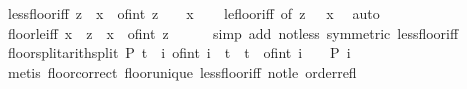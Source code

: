 \begin{isabellebody}
\endisatagproof
{\isafoldproof}%
%
\isadelimproof
\isanewline
%
\endisadelimproof
\isanewline
{}\isamarkupfalse%
\ less{\isacharunderscore}{\kern0pt}floor{\isacharunderscore}{\kern0pt}iff{\isacharcolon}{\kern0pt}\ {\isachardoublequoteopen}z\ {\isacharless}{\kern0pt}\ {\isasymlfloor}x{\isasymrfloor}\ {\isasymlongleftrightarrow}\ of{\isacharunderscore}{\kern0pt}int\ z\ {\isacharplus}{\kern0pt}\ {}\ {\isasymle}\ x{\isachardoublequoteclose}\isanewline
%
\isadelimproof
\ \ %
\endisadelimproof
%
\isatagproof
{}\isamarkupfalse%
\ le{\isacharunderscore}{\kern0pt}floor{\isacharunderscore}{\kern0pt}iff\ {\isacharbrackleft}{\kern0pt}of\ {\isachardoublequoteopen}z\ {\isacharplus}{\kern0pt}\ {}{\isachardoublequoteclose}\ x{\isacharbrackright}{\kern0pt}\ \isamarkupfalse%
\ auto%
\endisatagproof
{\isafoldproof}%
%
\isadelimproof
\isanewline
%
\endisadelimproof
\isanewline
{}\isamarkupfalse%
\ floor{\isacharunderscore}{\kern0pt}le{\isacharunderscore}{\kern0pt}iff{\isacharcolon}{\kern0pt}\ {\isachardoublequoteopen}{\isasymlfloor}x{\isasymrfloor}\ {\isasymle}\ z\ {\isasymlongleftrightarrow}\ x\ {\isacharless}{\kern0pt}\ of{\isacharunderscore}{\kern0pt}int\ z\ {\isacharplus}{\kern0pt}\ {}{\isachardoublequoteclose}\isanewline
%
\isadelimproof
\ \ %
\endisadelimproof
%
\isatagproof
{}\isamarkupfalse%
\ {\isacharparenleft}{\kern0pt}simp\ add{\isacharcolon}{\kern0pt}\ not{\isacharunderscore}{\kern0pt}less\ {\isacharbrackleft}{\kern0pt}symmetric{\isacharbrackright}{\kern0pt}\ less{\isacharunderscore}{\kern0pt}floor{\isacharunderscore}{\kern0pt}iff{\isacharparenright}{\kern0pt}%
\endisatagproof
{\isafoldproof}%
%
\isadelimproof
\isanewline
%
\endisadelimproof
\isanewline
{}\isamarkupfalse%
\ floor{\isacharunderscore}{\kern0pt}split{\isacharbrackleft}{\kern0pt}arith{\isacharunderscore}{\kern0pt}split{\isacharbrackright}{\kern0pt}{\isacharcolon}{\kern0pt}\ {\isachardoublequoteopen}P\ {\isasymlfloor}t{\isasymrfloor}\ {\isasymlongleftrightarrow}\ {\isacharparenleft}{\kern0pt}{\isasymforall}i{\isachardot}{\kern0pt}\ of{\isacharunderscore}{\kern0pt}int\ i\ {\isasymle}\ t\ {\isasymand}\ t\ {\isacharless}{\kern0pt}\ of{\isacharunderscore}{\kern0pt}int\ i\ {\isacharplus}{\kern0pt}\ {}\ {\isasymlongrightarrow}\ P\ i{\isacharparenright}{\kern0pt}{\isachardoublequoteclose}\isanewline
%
\isadelimproof
\ \ %
\endisadelimproof
%
\isatagproof
{}\isamarkupfalse%
\ {\isacharparenleft}{\kern0pt}metis\ floor{\isacharunderscore}{\kern0pt}correct\ floor{\isacharunderscore}{\kern0pt}unique\ less{\isacharunderscore}{\kern0pt}floor{\isacharunderscore}{\kern0pt}iff\ not{\isacharunderscore}{\kern0pt}le\ order{\isacharunderscore}{\kern0pt}refl{\isacharparenright}{\kern0pt}%

\end{isabellebody}
